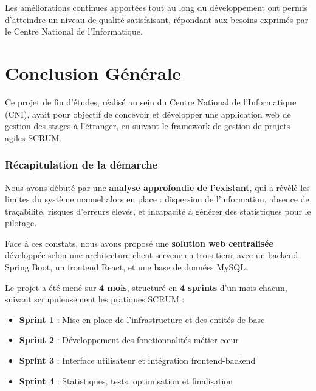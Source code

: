 \documentclass[12pt,a4paper]{report}
\begin{document}
Les améliorations continues apportées tout au long du développement ont permis d'atteindre un niveau de qualité satisfaisant, répondant aux besoins exprimés par le Centre National de l'Informatique.


\chapter*{Conclusion Générale}

Ce projet de fin d'études, réalisé au sein du Centre National de l'Informatique (CNI), avait pour objectif de concevoir et développer une application web de gestion des stages à l'étranger, en suivant le framework de gestion de projets agiles SCRUM.

\subsection*{Récapitulation de la démarche}

Nous avons débuté par une \textbf{analyse approfondie de l'existant}, qui a révélé les limites du système manuel alors en place : dispersion de l'information, absence de traçabilité, risques d'erreurs élevés, et incapacité à générer des statistiques pour le pilotage.

Face à ces constats, nous avons proposé une \textbf{solution web centralisée} développée selon une architecture client-serveur en trois tiers, avec un backend Spring Boot, un frontend React, et une base de données MySQL.

Le projet a été mené sur \textbf{4 mois}, structuré en \textbf{4 sprints} d'un mois chacun, suivant scrupuleusement les pratiques SCRUM :

\begin{itemize}[leftmargin=1cm]
    \item \textbf{Sprint 1} : Mise en place de l'infrastructure et des entités de base
    \item \textbf{Sprint 2} : Développement des fonctionnalités métier cœur
    \item \textbf{Sprint 3} : Interface utilisateur et intégration frontend-backend
    \item \textbf{Sprint 4} : Statistiques, tests, optimisation et finalisation
\end{itemize}
\end{document}
